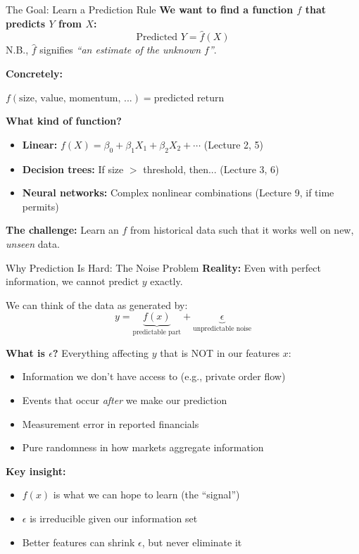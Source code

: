 \documentclass[10pt]{beamer}
\newcommand{\highlight}[1]{\textcolor{AccentOrange}{\textbf{#1}}}
\begin{document}
\begin{frame}{The Goal: Learn a Prediction Rule}
  \textbf{We want to find a function $f$ that predicts $Y$ from $X$:}
  \[
  \text{Predicted } Y = \widehat{f}(X)
  \]
  N.B., $\widehat{f}$ signifies \emph{``an estimate of the unknown $f$''}.

  \vspace{1em}
  \textbf{Concretely:}
  \begin{center}
    $f(\text{size, value, momentum, ...}) = \text{predicted return}$
  \end{center}
  
  \vspace{1em}
  \textbf{What kind of function?}
  \begin{itemize}
    \item \highlight{Linear:} $f(X) = \beta_0 + \beta_1 X_1 + \beta_2 X_2 + \cdots$ (Lecture 2, 5)
    \item \highlight{Decision trees:} If size $>$ threshold, then... (Lecture 3, 6)
    \item \highlight{Neural networks:} Complex nonlinear combinations (Lecture 9, if time permits)
  \end{itemize}
  
  \vspace{0.5em}
  \textbf{The challenge:} Learn an $f$ from historical data such that it works well on new, \emph{unseen} data.
\end{frame}

\begin{frame}{Why Prediction Is Hard: The Noise Problem}
  \textbf{Reality:} Even with perfect information, we cannot predict $y$ exactly.
  
  \vspace{0.5em}
  We can think of the data as generated by:
  \[
  y = \underbrace{f(x)}_{\text{predictable part}} + \underbrace{\epsilon}_{\text{unpredictable noise}}
  \]
  
  \vspace{0.5em}
  \textbf{What is $\epsilon$?} Everything affecting $y$ that is NOT in our features $x$:
  \begin{itemize}
    \item Information we don't have access to (e.g., private order flow)
    \item Events that occur \emph{after} we make our prediction
    \item Measurement error in reported financials
    \item Pure randomness in how markets aggregate information
  \end{itemize}
  
  \vspace{1em}
  \textbf{Key insight:} 
  \begin{itemize}
    \item $f(x)$ is what we can hope to learn (the ``signal'')
    \item $\epsilon$ is irreducible given our information set
    \item Better features can shrink $\epsilon$, but never eliminate it
  \end{itemize}
\end{frame}
\end{document}
